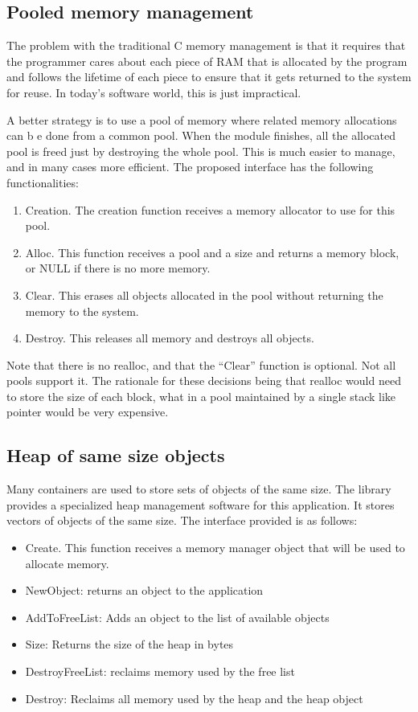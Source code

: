 \documentclass[12pt,a4paper]{memoir} %
\newcommand{\Null}{
{\footnotesize NULL}
}
\begin{document}
\subsection{Pooled memory management}
The problem with the traditional C memory management is that it requires that the programmer cares about each piece of RAM that is allocated by the program and follows the lifetime of each piece to ensure that it gets returned to the system for reuse. In today's software world, this is just impractical.

A better strategy is to use a pool of memory where related memory allocations can b e done from a common pool. When the module finishes, all the allocated pool is freed just by destroying the whole pool. This is much easier to manage, and in many cases more efficient.
The proposed interface has the following functionalities:
\begin{enumerate}
\item Creation. The creation function receives a memory allocator to use for this pool.
\item Alloc. This function receives a pool and a size and returns a memory block, or\Null if there is no more memory.
\item Clear. This erases all objects allocated in the pool without returning the memory to the system.
\item Destroy. This releases all memory and destroys all objects.
\end{enumerate}
Note that there is no realloc, and that the “Clear” function is optional. Not all pools support it. The rationale for these decisions being that realloc would need to store the size of each block, what in a pool maintained by a single stack like pointer would be very expensive.
\subsection{Heap of same size objects}
Many containers are used to store sets of objects of the same size. The library provides a specialized heap management software for this application. It stores vectors of objects of the same size. The interface provided is as follows:
\begin{itemize}
\item Create. This function receives a memory manager object that will be used to allocate memory.
\item NewObject: returns an object to the application
\item AddToFreeList: Adds an object to the list of available objects
\item Size: Returns the size of the heap in bytes
\item DestroyFreeList: reclaims memory used by the free list
\item Destroy: Reclaims all memory used by the heap and the heap object
\end{itemize}
\end{document}
